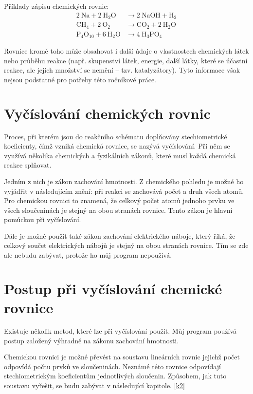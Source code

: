 \documentclass[12pt,a4paper]{report}
\newcommand{\n}[1]{\mbox{#1}}
\newcommand{\sipka}{\rightarrow}
\begin{document}
Příklady zápisu chemických rovnic:
\begin{align*}
 	2~\n{Na} + 2~\n{H}_2\n{O} &\sipka 2~\n{NaOH}+\n{H}_2\\
 	\n{CH}_4 + 2~\n{O}_2 &\sipka \n{CO}_2 + 2~\n{H}_2\n{O}\\
 	\n{P}_4\n{O}_{10} + 6~\n{H}_2\n{O} &\sipka 4~\n{H}_3\n{PO}_4
\end{align*}

Rovnice kromě toho může obsahovat i další údaje o vlastnostech chemických látek nebo průběhu reakce (např. skupenství látek, energie, další látky, které se účastní reakce, ale jejich množství se nemění -- tzv. katalyzátory). Tyto informace však nejsou podstatné pro potřeby této ročníkové práce. \cite{wiki}

\section{Vyčíslování chemických rovnic}
Proces, při kterém jsou do reakčního schématu doplňovány stechiometrické koeficienty, čímž vzniká chemická rovnice, se nazývá vyčíslování. Při něm se využívá několika chemických a fyzikálních zákonů, které musí každá chemická reakce splňovat.

Jedním z nich je zákon zachování hmotnosti. Z chemického pohledu je možné ho vyjádřit v následujícím znění: při reakci se zachovává počet a druh všech atomů. Pro chemickou rovnici to znamená, že celkový počet atomů jednoho prvku ve všech sloučeninách je stejný na obou stranách rovnice. Tento zákon je hlavní pomůckou při vyčíslování. \cite{uch}

Dále je možné použít také zákon zachování elektrického náboje, který říká, že celkový součet elektrických nábojů je stejný na obou stranách rovnice. Tím se zde ale nebudu zabývat, protože ho můj program nepoužívá.

\section{Postup při vyčíslování chemické rovnice}\label{postup_vycisleni}
Existuje několik metod, které lze při vyčíslování použít. Můj program používá postup založený výhradně na zákonu zachování hmotnosti.

Chemickou rovnici je možné převést na soustavu lineárních rovnic jejichž počet odpovídá počtu prvků ve sloučeninách. Neznámé této rovnice odpovídají ste\-chio\-metrickým koeficientům jednotlivých sloučenin. Způsobem, jak tuto soustavu vyřešit, se budu zabývat v následující kapitole. \ref{k2}
\end{document}
